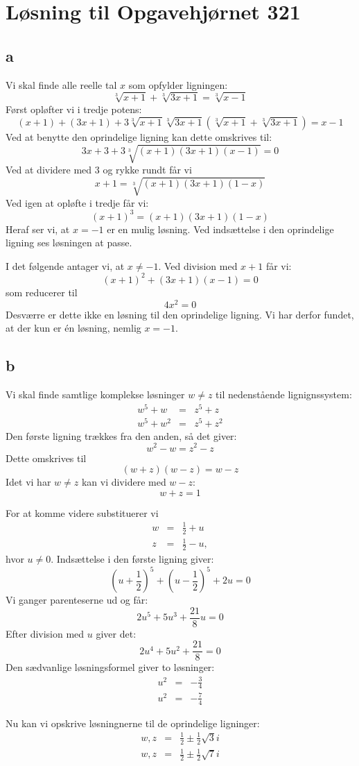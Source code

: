 \documentclass[12pt,oneside,a4paper]{article}
\newcommand{\bas}{\begin{eqnarray*}}
\newcommand{\eas}{\end{eqnarray*}}
\begin{document}
\section*{Løsning til Opgavehjørnet 321}

\subsection*{a}
Vi skal finde alle reelle tal $x$ som opfylder ligningen:
$$
\sqrt[3]{x+1} + \sqrt[3]{3x+1} = \sqrt[3]{x-1}
$$
Først opløfter vi i tredje potens:
$$
(x+1) + (3x+1) + 3\sqrt[3]{x+1}\sqrt[3]{3x+1}\left(\sqrt[3]{x+1} + \sqrt[3]{3x+1}\right) = x-1
$$
Ved at benytte den oprindelige ligning kan dette omskrives til:
$$
3x + 3 + 3\sqrt[3]{(x+1)(3x+1)(x-1)} = 0
$$
Ved at dividere med $3$ og rykke rundt får vi
$$
x + 1 = \sqrt[3]{(x+1)(3x+1)(1-x)}
$$
Ved igen at opløfte i tredje får vi:
$$
(x+1)^3 = (x+1)(3x+1)(1-x)
$$
Heraf ser vi, at $x=-1$ er en mulig løsning. Ved indsættelse i den oprindelige ligning ses løsningen at passe.

I det følgende antager vi, at $x\neq -1$. Ved division med $x+1$ får vi:
$$
(x+1)^2 + (3x+1)(x-1) = 0
$$
som reducerer til
$$
4x^2=0
$$
Desværre er dette ikke en løsning til den oprindelige ligning. Vi har derfor fundet, at der kun er én løsning, nemlig $x=-1$.

\subsection*{b}
Vi skal finde samtlige komplekse løsninger $w\neq z$ til nedenstående lignignssystem:
\bas
w^5 + w &=& z^5 + z \\
w^5 + w^2 &=& z^5 + z^2
\eas
Den første ligning trækkes fra den anden, så det giver:
$$
w^2 - w = z^2 - z
$$
Dette omskrives til
$$
(w+z)(w-z) = w-z
$$
Idet vi har $w\neq z$ kan vi dividere med $w-z$:
$$
w+z=1
$$

For at komme videre substituerer vi
\bas
w &=& \frac12 + u \\
z &=& \frac12 - u ,
\eas
hvor $u\neq 0$.
Indsættelse i den første ligning giver:
$$
\left(u+\frac12\right)^5 + \left(u-\frac12\right)^5+2u=0
$$
Vi ganger parenteserne ud og får:
$$
2u^5 + 5u^3 + \frac{21}{8}u = 0
$$
Efter division med $u$ giver det:
$$
2u^4 + 5u^2 + \frac{21}{8} = 0
$$
Den sædvanlige løsningsformel giver to løsninger:
\bas
u^2 &=& -\frac{3}{4}\\
u^2 &=& -\frac{7}{4}
\eas

Nu kan vi opskrive løsningnerne til de oprindelige ligninger:
\bas
w,z &=& \frac12 \pm \frac12 \sqrt{3} i \\
w,z &=& \frac12 \pm \frac12 \sqrt{7} i
\eas
\end{document}
